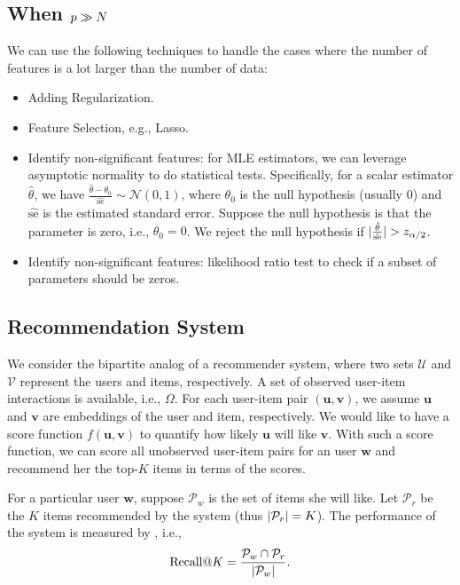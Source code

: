             
    \subsection{When $p \gg N$}
        We can use the following techniques to handle the cases where the number of features is a lot larger than the number of data:
            \begin{itemize}
                \item Adding Regularization.
                \item Feature Selection, e.g., Lasso.
                \item Identify non-significant features: for MLE estimators, we can leverage asymptotic normality to do statistical tests.
                Specifically, for a scalar estimator $\hat{\theta}$, we have $\frac{\hat{\theta} - \theta_0 }{\hat{\text{se}}} \sim \mathcal{N}(0, 1)$, where $\theta_0$ is the null hypothesis (usually $0$) and $\hat{\text{se}}$ is the estimated standard error.
                Suppose the null hypothesis is that the parameter is zero, i.e., $\theta_0=0$. 
                We reject the null hypothesis if $| \frac{\hat{\theta} }{\hat{\text{se}}} | > z_{\alpha/2}$.
                \item Identify non-significant features: likelihood ratio test to check if a subset of parameters should be zeros.
            \end{itemize}
            
    
    \subsection{Recommendation System}
        
        We consider the bipartite analog of a recommender system, where two sets $\mathcal{U}$ and $\mathcal{V}$ represent the users and items, respectively.
        A set of observed user-item interactions is available, i.e., $\Omega$.
        For each user-item pair $(\bm{u}, \bm{v})$, we assume $\bm{u}$ and $\bm{v}$ are embeddings of the user and item, respectively.
        We would like to have a score function $f(\bm{u}, \bm{v})$ to quantify how likely $\bm{u}$ will like $\bm{v}$.
        With such a score function, we can score all unobserved user-item pairs for an user $\bm{w}$ and recommend her the top-$K$ items in terms of the scores.
        
        For a particular user $\bm{w}$, suppose $\mathcal{P}_w$ is the set of items she will like.
        Let $\mathcal{P}_r$ be the $K$ items recommended by the system (thus $| \mathcal{P}_r | = K$).
        The performance of the system is measured by \RecallAtK, i.e., 
            \begin{equation}
                 \text{Recall}@K  = \frac{\mathcal{P}_w \cap \mathcal{P}_r}{| \mathcal{P}_w |}.
            \end{equation}
            
